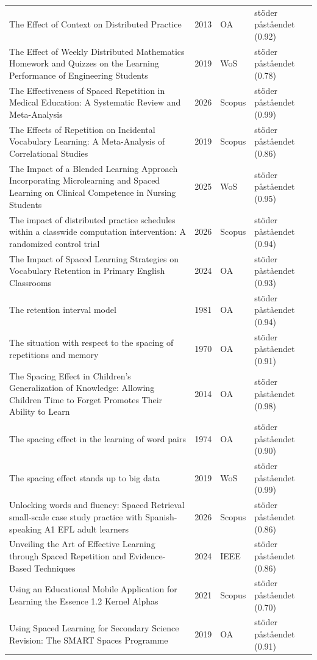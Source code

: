 \begin{longtable}{@{}%
  >{\raggedright\arraybackslash}p{}c%
  >{\raggedright\arraybackslash}p{}%
  >{\raggedright\arraybackslash}p{}@{}}
The Effect of Context on Distributed Practice & 2013 & OA & stöder påståendet (0.92) \\
The Effect of Weekly Distributed Mathematics Homework and Quizzes on the Learning Performance of Engineering Students & 2019 & WoS & stöder påståendet (0.78) \\
The Effectiveness of Spaced Repetition in Medical Education: A Systematic Review and Meta-Analysis & 2026 & Scopus & stöder påståendet (0.99) \\
The Effects of Repetition on Incidental Vocabulary Learning: A Meta-Analysis of Correlational Studies & 2019 & Scopus & stöder påståendet (0.86) \\
The Impact of a Blended Learning Approach Incorporating Microlearning and Spaced Learning on Clinical Competence in Nursing Students & 2025 & WoS & stöder påståendet (0.95) \\
The impact of distributed practice schedules within a classwide computation intervention: A randomized control trial & 2026 & Scopus & stöder påståendet (0.94) \\
The Impact of Spaced Learning Strategies on Vocabulary Retention in Primary English Classrooms & 2024 & OA & stöder påståendet (0.93) \\
The retention interval model & 1981 & OA & stöder påståendet (0.94) \\
The situation with respect to the spacing of repetitions and memory & 1970 & OA & stöder påståendet (0.91) \\
The Spacing Effect in Children's Generalization of Knowledge: Allowing Children Time to Forget Promotes Their Ability to Learn & 2014 & OA & stöder påståendet (0.98) \\
The spacing effect in the learning of word pairs & 1974 & OA & stöder påståendet (0.90) \\
The spacing effect stands up to big data & 2019 & WoS & stöder påståendet (0.99) \\
Unlocking words and fluency: Spaced Retrieval small-scale case study practice with Spanish-speaking A1 EFL adult learners & 2026 & Scopus & stöder påståendet (0.86) \\
Unveiling the Art of Effective Learning through Spaced Repetition and Evidence-Based Techniques & 2024 & IEEE & stöder påståendet (0.86) \\
Using an Educational Mobile Application for Learning the Essence 1.2 Kernel Alphas & 2021 & Scopus & stöder påståendet (0.70) \\
Using Spaced Learning for Secondary Science Revision: The SMART Spaces Programme & 2019 & OA & stöder påståendet (0.91) \\

\end{longtable}
